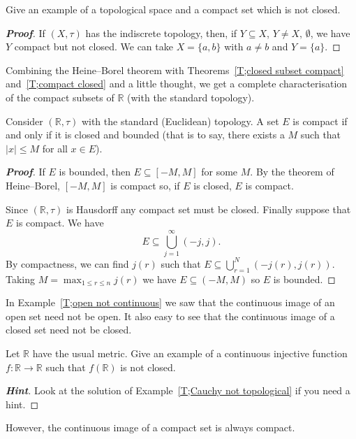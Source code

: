 \begin{theorem}\label{T;compact not closed} 
Give an example of a topological space
and a compact set which is not closed.
\end{theorem}
\begin{proof}[\bf Proof] If $(X,\tau)$ has the indiscrete topology,
then, if $Y\subseteq X$, $Y\neq X,\,\emptyset$, we have $Y$
compact but not closed. We can take $X=\{a,b\}$ with $a\neq b$ 
and $Y=\{a\}$.
\end{proof}


Combining the Heine--Borel theorem with
Theorems~\ref{T;closed subset compact}
and~\ref{T;compact closed} and a little thought,
we get a complete characterisation of the compact subsets
of ${\mathbb R}$ (with the standard topology).

\begin{theorem}\label{T;closed bounded}
Consider $({\mathbb R},\tau)$ with the standard 
(Euclidean) topology. A set $E$ is compact if and
only if it is closed and bounded
(that is to say, there exists a 
$M$ such that $|x|\leq M$ for all $x\in E$).
\end{theorem}
\begin{proof}[\bf Proof] If $E$ is bounded, then $E\subseteq [-M,M]$
for some $M$. By the theorem of Heine--Borel, $[-M,M]$
is compact so, if $E$ is closed, $E$ is compact.

Since $({\mathbb R},\tau)$ is Hausdorff any compact set must be closed.
Finally suppose that $E$ is compact. We have
\[E\subseteq \bigcup_{j=1}^{\infty}(-j,j).\]
By compactness, we can find $j(r)$ such that $E \subseteq\bigcup_{r=1}^{N}(-j(r),j(r))$. Taking $M=\max_{1\leq r\leq n}j(r)$ we have $E\subseteq(-M,M)$ so
$E$ is bounded.
\end{proof}


In Example~\ref{T;open not continuous} we saw that the
continuous image of an open set need not be open.
It also easy to see that the
continuous image of a closed set need not be closed.
\begin{exercise} Let ${\mathbb R}$ have the usual metric.
Give an example of a continuous injective function
$f:{\mathbb R}\rightarrow{\mathbb R}$ such that
$f({\mathbb R})$ is not closed.
\end{exercise}
\begin{proof}[\bf Hint] Look at the solution of Example~\ref{T;Cauchy not topological} if you need a hint.
\end{proof}

However, the continuous image of a compact set
is always compact.


